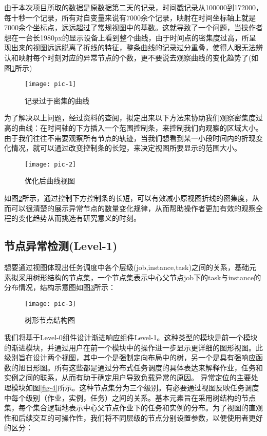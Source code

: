 
由于本次项目所取的数据是原数据第二天的记录，时间戳记录从100000到172000，每十秒一个记录，所有对自变量来说有7000余个记录，映射在时间坐标轴上就是7000余个坐标点，远远超过了常规视图中的基数。这就导致了一个问题，当操作者想在一台长1980px的显示设备上看到整个曲线，由于时间点的密集度过高，所呈现出来的视图远远脱离了折线的特征，整条曲线的记录过分重叠，使得人眼无法辨认和映射每个时刻对应的异常节点的个数，更不要说去观察曲线的变化趋势了(如图\ref{pic-1}所示)

\begin{figure}[h]
	\centering
	\texttt{[image: pic-1]}
	\caption{记录过于密集的曲线}
	\label{pic-1}
\end{figure}

为了解决以上问题，经过资料的查阅，拟定出来以下方法来协助我们观察密集度过高的曲线：在时间轴的下方插入一个范围控制条，来控制我们向观察的区域大小。由于我们往往不需要观察所有节点的轨迹，当我们想看到某一小段时间内的折现变化情况，就可以通过改变控制条的长短，来决定视图所要显示的范围大小。

\begin{figure}[h]
	\centering
	\texttt{[image: pic-2]}
	\caption{优化后曲线视图}
	\label{pic-2}
\end{figure}

如图\ref{pic-2}所示，通过控制下方控制条的长短，可以有效减小原视图折线的密集度，从而可以很清楚的展示异常节点的数量变化规律，从而帮助操作者更加有效的观察全程的变化趋势从而挑选有研究意义的时刻。

\subsection{节点异常检测(Level-1)}

想要通过视图体现出任务调度中各个层级(job,instance,task)之间的关系，基础元素拟采用树形结构的节点集，一个节点集表示中心父节点job下的task与instance的分布情况，结构示意图如图\ref{pic-3}所示：

\begin{figure}[h]
	\centering
	\texttt{[image: pic-3]}
	\caption{树形节点结构图}
	\label{pic-3}
\end{figure}

我们将基于Level-0组件设计渐进响应组件Level-1。这种类型的模块是前一个模块的渐进模块，并通过用户在前一个模块中的操作进一步显示更详细的图形视图。此级别旨在设计两个视图，其中一个是强制定向布局中的树，另一个是具有强响应函数的旭日形图。所有这些都是通过分布式任务调度的具体表达来解释作业，任务和实例之间的联系，从而有助于确定用户导致负载异常的原因。
异常定位的主要处理模块如图\ref{fig-4}所示。这种节点集分为三个级别。有必要通过视图反映任务调度中每个级别（作业，实例，任务）之间的关系。基本元素旨在采用树结构的节点集，每个集合逻辑地表示中心父节点作业下的任务和实例的分布。为了视图的直观性和后续交互的可操作性，我们将不同层级的节点分别设置参数，以便使用者更好的区分：


